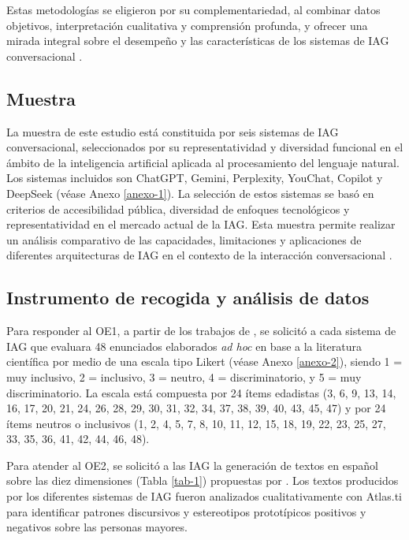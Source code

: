 \documentclass[spanish]{textolivre}
\begin{document}
Estas metodologías se eligieron por su complementariedad, al combinar datos objetivos, interpretación cualitativa y comprensión profunda, y ofrecer una mirada integral sobre el desempeño y las características de los sistemas de IAG conversacional \cite{raimbault2019}.

\subsection{Muestra}
La muestra de este estudio está constituida por seis sistemas de IAG conversacional, seleccionados por su representatividad y diversidad funcional en el ámbito de la inteligencia artificial aplicada al procesamiento del lenguaje natural. Los sistemas incluidos son ChatGPT, Gemini, Perplexity, YouChat, Copilot y DeepSeek (véase Anexo \ref{anexo-1}). La selección de estos sistemas se basó en criterios de accesibilidad pública, diversidad de enfoques tecnológicos y representatividad en el mercado actual de la IAG. Esta muestra permite realizar un análisis comparativo de las capacidades, limitaciones y aplicaciones de diferentes arquitecturas de IAG en el contexto de la interacción conversacional \cite{arandarubio2024, sallam2025}.

\subsection{Instrumento de recogida y análisis de datos}
Para responder al OE1, a partir de los trabajos de \textcite{arandarubio2024, blancamena2005}, se solicitó a cada sistema de IAG que evaluara 48 enunciados elaborados \textit{ad hoc} en base a la literatura científica por medio de una escala tipo Likert (véase Anexo \ref{anexo-2}), siendo 1 = muy inclusivo, 2 = inclusivo, 3 = neutro, 4 = discriminatorio, y 5 = muy discriminatorio. La escala está compuesta por 24 ítems edadistas (3, 6, 9, 13, 14, 16, 17, 20, 21, 24, 26, 28, 29, 30, 31, 32, 34, 37, 38, 39, 40, 43, 45, 47) y por 24 ítems neutros o inclusivos (1, 2, 4, 5, 7, 8, 10, 11, 12, 15, 18, 19, 22, 23, 25, 27, 33, 35, 36, 41, 42, 44, 46, 48).

Para atender al OE2, se solicitó a las IAG la generación de textos en español sobre las diez dimensiones (Tabla \ref{tab-1}) propuestas por \textcite{rothermund2024}. Los textos producidos por los diferentes sistemas de IAG fueron analizados cualitativamente con Atlas.ti para identificar patrones discursivos y estereotipos prototípicos positivos y negativos sobre las personas mayores.
\end{document}
